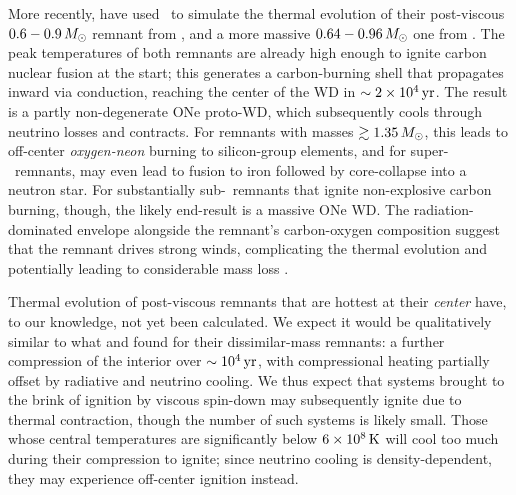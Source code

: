 More recently, \cite{schw+16} have used \mesa\ to simulate the thermal evolution of their post-viscous $0.6-0.9\,\Msun$ remnant from \cite{schw+12}, and a more massive $0.64-0.96\,\Msun$ one from \cite{rask+14}.  The peak temperatures of both remnants are already high enough to ignite carbon nuclear fusion at the start; this generates a carbon-burning shell that propagates inward via conduction, reaching the center of the WD in $\sim2\times10^4\,\mathrm{yr}$.  The result is a partly non-degenerate ONe proto-WD, which subsequently cools through neutrino losses and contracts.  For remnants with masses $\gtrsim1.35\,\Msun$, this leads to off-center \textit{oxygen-neon} burning to silicon-group elements, and for super-\Mch\ remnants, may even lead to fusion to iron followed by core-collapse into a neutron star.  For substantially sub-\Mch\ remnants that ignite non-explosive carbon burning, though, the likely end-result is a massive ONe WD.  The radiation-dominated envelope alongside the remnant's carbon-oxygen composition suggest that the remnant drives strong winds, complicating the thermal evolution and potentially leading to considerable mass loss \citep{shen+12, schw+16}.


Thermal evolution of post-viscous remnants that are hottest at their \textit{center} have, to our knowledge, not yet been calculated.  We expect it would be qualitatively similar to what \cite{shen+12} and \cite{schw+16} found for their dissimilar-mass remnants: a further compression of the interior over $\sim10^4\,\mathrm{yr}$, with compressional heating partially offset by radiative and neutrino cooling.  We thus expect that systems brought to the brink of ignition by viscous spin-down may subsequently ignite due to thermal contraction, though the number of such systems is likely small.  Those whose central temperatures are significantly below $6\times10^8\,\mathrm{K}$ will cool too much during their compression to ignite; since neutrino cooling is density-dependent, they may experience off-center ignition instead.
